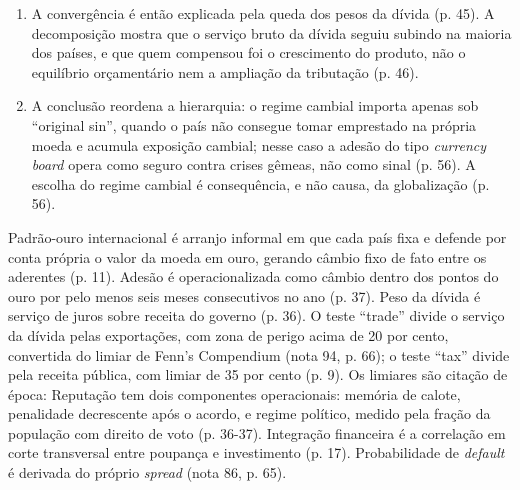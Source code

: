 \begin{enumerate}[leftmargin=*,nosep]
\item A convergência é então explicada pela queda dos pesos da dívida
(p. 45). A decomposição mostra que o serviço bruto da dívida seguiu subindo na
maioria dos países, e que quem compensou foi o crescimento do produto, não o
equilíbrio orçamentário nem a ampliação da tributação (p. 46).
\item A conclusão reordena a hierarquia: o regime cambial importa apenas sob
``original sin'', quando o país não consegue tomar emprestado na própria moeda
e acumula exposição cambial; nesse caso a adesão do tipo \emph{currency board}
opera como seguro contra crises gêmeas, não como sinal (p. 56). A escolha do
regime cambial é consequência, e não causa, da globalização (p. 56).
\end{enumerate}

Padrão-ouro internacional é arranjo informal em que cada país fixa e defende
por conta própria o valor da moeda em ouro, gerando câmbio fixo de fato entre
os aderentes (p. 11). Adesão é operacionalizada como câmbio dentro dos pontos
do ouro por pelo menos seis meses consecutivos no ano (p. 37). Peso da dívida
é serviço de juros sobre receita do governo (p. 36). O teste ``trade'' divide o
serviço da dívida pelas exportações, com zona de perigo acima de 20 por cento,
convertida do limiar de Fenn's Compendium (nota 94, p. 66); o teste ``tax''
divide pela receita pública, com limiar de 35 por cento (p. 9). Os limiares são
citação de época:
Reputação tem dois componentes operacionais: memória de calote, penalidade
decrescente após o acordo, e regime político, medido pela fração da população
com direito de voto (p. 36-37). Integração financeira é a correlação em corte
transversal entre poupança e investimento (p. 17). Probabilidade de
\emph{default} é derivada do próprio \emph{spread} (nota 86, p. 65).

